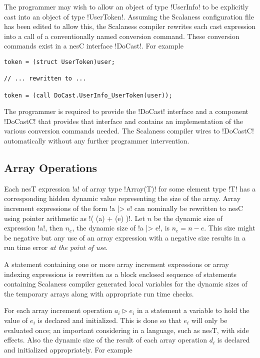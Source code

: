 The programmer may wish to allow an object of type !UserInfo! to be explicitly cast into an
object of type !UserToken!. Assuming the Scalaness configuration file has been edited to allow
this, the Scalaness compiler rewrites each cast expression into a call of a conventionally named
conversion command. These conversion commands exist in a nesC interface !DoCast!. For example

\singlespace
\vspace{1.0ex}
\begin{lstlisting}[language=nesC]
token = (struct UserToken)user;

// ... rewritten to ...

token = (call DoCast.UserInfo_UserToken(user));
\end{lstlisting}
\vspace{1.0ex}
\primaryspacing

The programmer is required to provide the !DoCast! interface and a component !DoCastC! that
provides that interface and contains an implementation of the various conversion commands
needed. The Scalaness compiler wires to !DoCastC! automatically without any further programmer
intervention.


\subsection{Array Operations}
\label{section-array-operations}

Each nesT expression !a! of array type !Array(T)! for some element type !T! has a corresponding
hidden dynamic value representing the size of the array. Array increment expressions of the form
!a |> e! can nominally be rewritten to nesC using pointer arithmetic as !( (a) + (e) )!. Let $n$
be the dynamic size of expression !a!, then $n_e$, the dynamic size of !a |> e!, is $n_e = n -
e$. This size might be negative but any use of an array expression with a negative size results
in a run time error \emph{at the point of use}.

A statement containing one or more array increment expressions or array indexing expressions is
rewritten as a block enclosed sequence of statements containing Scalaness compiler generated
local variables for the dynamic sizes of the temporary arrays along with appropriate run time
checks.

For each array increment operation $a_i \rhd e_i$ in a statement a variable to hold the value of
$e_i$ is declared and initialized. This is done so that $e_i$ will only be evaluated once; an
important considering in a language, such as nesT, with side effects. Also the dynamic size of
the result of each array operation $d_i$ is declared and initialized appropriately. For example

